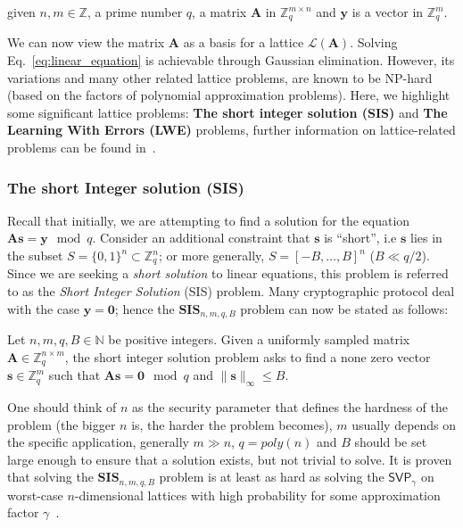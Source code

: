 \documentclass[cryptography,review,submit,pdftex,moreauthors,amsmath,amssymb,aps,strict]{Definitions/mdpi}
\begin{document}
given $n,m \in \mathbb{Z}$, a prime number $q$, a matrix $\mathbf{A}$ in $\mathbb{Z}^{m\times n}_q$ and $\mathbf{y}$ is a vector in $\mathbb{Z}^m_q$. 

We can now view the matrix $\mathbf{A}$ as a basis for a lattice $\mathcal{L}(\mathbf{A})$. Solving Eq.~\eqref{eq:linear_equation} is achievable through Gaussian elimination. However, its variations and many other related lattice problems, are known to be NP-hard (based on the factors of polynomial approximation problems). Here, we highlight some significant lattice problems: \textbf{The short integer solution (SIS)} and \textbf{The Learning With Errors (LWE)} problems, further information on lattice-related problems can be found in~\cite{Pei16}.

\subsubsection{The short Integer solution (SIS)}

Recall that initially, we are attempting to find a solution for the equation $\mathbf{A}\mathbf{s} = \mathbf{y} \mod q$. Consider an additional constraint that $\mathbf{s}$ is ``short'', i.e $\mathbf{s}$ lies in the subset $S=\{0,1\}^n\subset\mathbb{Z}^n_q$; or more generally, $S=[-B,\dots, B]^n$  ($B\ll q/2$). Since we are seeking a \textit{short solution} to linear equations, this problem is referred to as the \textit{Short Integer Solution} (SIS) problem. Many cryptographic protocol deal with the case $\mathbf{y}=\mathbf{0}$; hence the $\mathbf{SIS}_{n,m,q,B}$ problem can now be stated as follows:

\begin{Definition}
    Let $n,m,q, B \in \mathbb{N}$ be positive integers. Given a uniformly sampled matrix $\mathbf{A}\in\mathbb{Z}^{n\times m}_q$, the short integer solution problem asks to find a none zero vector $\mathbf{s}\in\mathbb{Z}^m_q$ such that $\mathbf{A}\mathbf{s}=\mathbf{0}\mod q$ and $\|\mathbf{s}\|_{\infty}\leq B$.
\end{Definition}

One should think of $n$ as the security parameter that defines the hardness of the problem (the bigger $n$ is, the harder the problem becomes), $m$ usually depends on the specific application, generally $m\gg n$, $q=poly(n)$ and $B$ should be set large enough to ensure that a solution exists, but not trivial to solve. It is proven that solving the $\mathbf{SIS}_{n,m,q, B}$ problem is at least as hard as solving the $\mathsf{SVP}_{\gamma}$ on worst-case $n$-dimensional lattices with high probability for some approximation factor $\gamma$~\cite{Pei16}.
\end{document}
